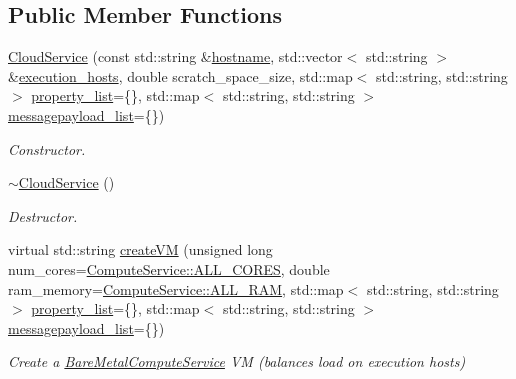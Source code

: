 \subsection*{Public Member Functions}
\begin{DoxyCompactItemize}
\item 
\hyperlink{classwrench_1_1_cloud_service_a9f7f2d8bbbcaf2cd1c2cc881d11afec3}{Cloud\+Service} (const std\+::string \&\hyperlink{classwrench_1_1_s4_u___daemon_a52bc0b9a6cd248310749dac086819f00}{hostname}, std\+::vector$<$ std\+::string $>$ \&\hyperlink{classwrench_1_1_cloud_service_a8225cae457e491f3f3aad32653910ea0}{execution\+\_\+hosts}, double scratch\+\_\+space\+\_\+size, std\+::map$<$ std\+::string, std\+::string $>$ \hyperlink{classwrench_1_1_service_a032143b1e2d7296dde9b4ca1e34845ce}{property\+\_\+list}=\{\}, std\+::map$<$ std\+::string, std\+::string $>$ \hyperlink{classwrench_1_1_service_a63865f20c92027ab626ab1347b0099d2}{messagepayload\+\_\+list}=\{\})
\begin{DoxyCompactList}\small\item\em Constructor. \end{DoxyCompactList}\item 
\mbox{\label{classwrench_1_1_cloud_service_a01b85c41bec59fb3698fc5d86b95ef54}} 
\hyperlink{classwrench_1_1_cloud_service_a01b85c41bec59fb3698fc5d86b95ef54}{$\sim$\+Cloud\+Service} ()
\begin{DoxyCompactList}\small\item\em Destructor. \end{DoxyCompactList}\item 
virtual std\+::string \hyperlink{classwrench_1_1_cloud_service_a6e614c2edbe303de83a47c024e84e250}{create\+VM} (unsigned long num\+\_\+cores=\hyperlink{classwrench_1_1_compute_service_a1160f521623440ad4e0e0823e08a7d22}{Compute\+Service\+::\+A\+L\+L\+\_\+\+C\+O\+R\+ES}, double ram\+\_\+memory=\hyperlink{classwrench_1_1_compute_service_abc4fe0bad59f544b4b34d0e7d4012d44}{Compute\+Service\+::\+A\+L\+L\+\_\+\+R\+AM}, std\+::map$<$ std\+::string, std\+::string $>$ \hyperlink{classwrench_1_1_service_a032143b1e2d7296dde9b4ca1e34845ce}{property\+\_\+list}=\{\}, std\+::map$<$ std\+::string, std\+::string $>$ \hyperlink{classwrench_1_1_service_a63865f20c92027ab626ab1347b0099d2}{messagepayload\+\_\+list}=\{\})
\begin{DoxyCompactList}\small\item\em Create a \hyperlink{classwrench_1_1_bare_metal_compute_service}{Bare\+Metal\+Compute\+Service} VM (balances load on execution hosts) \end{DoxyCompactList}\item 

\end{DoxyCompactItemize}
